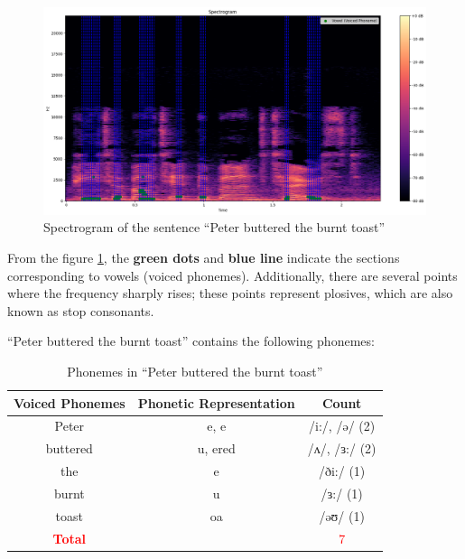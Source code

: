 \begin{figure}[H]
    \centering
    \includegraphics[width=\textwidth]{./img/Q1-1.png}
    \caption{Spectrogram of the sentence “Peter buttered the burnt toast”}
    \label{fig:Question1-2}
\end{figure}


From the figure \ref{fig:Question1-2}, the \textbf{green dots} and \textbf{blue line} indicate the sections corresponding to vowels (voiced phonemes). Additionally, there are several points where the frequency sharply rises; these points represent plosives, which are also known as stop consonants.

``Peter buttered the burnt toast'' contains the following phonemes:

\begin{table}[H]
    \centering
    \begin{tabular}{|c|c|c|}
        \hline
        \textbf{Voiced Phonemes} & \textbf{Phonetic Representation} & \textbf{Count} \\ \hline
        Peter  & e, e & /i:/, /ə/ (2) \\ \hline
        buttered & u, ered & /ʌ/, /ɜ:/ (2) \\ \hline
        the & e & /ði:/ (1) \\ \hline
        burnt & u & /ɜ:/ (1) \\ \hline
        toast & oa & /əʊ/ (1) \\ \hline
        \textcolor{red}{\textbf{Total}} & & \textcolor{red}{7} \\ \hline
    \end{tabular}
    \caption{Phonemes in ``Peter buttered the burnt toast''}
\end{table}

